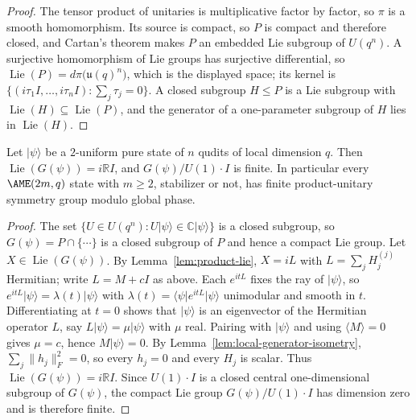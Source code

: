 \begin{proof}
The tensor product of unitaries is multiplicative factor by factor, so
\(\pi\) is a smooth homomorphism.  Its source is compact, so \(P\) is
compact and therefore closed, and Cartan's theorem makes \(P\) an embedded
Lie subgroup of \(U(q^n)\).  A surjective homomorphism of Lie groups has
surjective differential, so
\(\operatorname{Lie}(P)=d\pi\bigl(\mathfrak u(q)^n\bigr)\), which is the
displayed space; its kernel is
\(\{(i\tau_1I,\ldots,i\tau_nI):\sum_j\tau_j=0\}\).  A closed subgroup
\(H\leq P\) is a Lie subgroup with
\(\operatorname{Lie}(H)\subseteq\operatorname{Lie}(P)\), and the generator
of a one-parameter subgroup of \(H\) lies in \(\operatorname{Lie}(H)\).
\end{proof}

\begin{theorem}
\label{thm:two-uniform-discrete}
Let \(\lvert\psi\rangle\) be a \(2\)-uniform pure state of \(n\) qudits of
local dimension \(q\).  Then \(\operatorname{Lie}(G(\psi))=i\mathbb RI\),
and \(G(\psi)/U(1)\cdot I\) is finite.  In particular every
\(\AME(2m,q)\) state with \(m\geq2\), stabilizer or not, has finite
product-unitary symmetry group modulo global phase.
\end{theorem}

\begin{proof}
The set \(\{U\in U(q^n):U\lvert\psi\rangle\in\mathbb C\lvert\psi\rangle\}\)
is a closed subgroup, so \(G(\psi)=P\cap\{\cdots\}\) is a closed subgroup
of \(P\) and hence a compact Lie group.  Let
\(X\in\operatorname{Lie}(G(\psi))\).  By Lemma~\ref{lem:product-lie},
\(X=iL\) with \(L=\sum_jH_j^{(j)}\) Hermitian; write \(L=M+cI\) as above.
Each \(e^{itL}\) fixes the ray of \(\lvert\psi\rangle\), so
\(e^{itL}\lvert\psi\rangle=\lambda(t)\lvert\psi\rangle\) with
\(\lambda(t)=\langle\psi\rvert e^{itL}\lvert\psi\rangle\) unimodular and
smooth in \(t\).  Differentiating at \(t=0\) shows that
\(\lvert\psi\rangle\) is an eigenvector of the Hermitian operator \(L\),
say \(L\lvert\psi\rangle=\mu\lvert\psi\rangle\) with \(\mu\) real.  Pairing
with \(\lvert\psi\rangle\) and using \(\langle M\rangle=0\) gives
\(\mu=c\), hence \(M\lvert\psi\rangle=0\).  By
Lemma~\ref{lem:local-generator-isometry}, \(\sum_j\lVert h_j\rVert_F^2=0\),
so every \(h_j=0\) and every \(H_j\) is scalar.  Thus
\(\operatorname{Lie}(G(\psi))=i\mathbb RI\).  Since \(U(1)\cdot I\) is a
closed central one-dimensional subgroup of \(G(\psi)\), the compact Lie
group \(G(\psi)/U(1)\cdot I\) has dimension zero and is therefore finite.
\end{proof}

